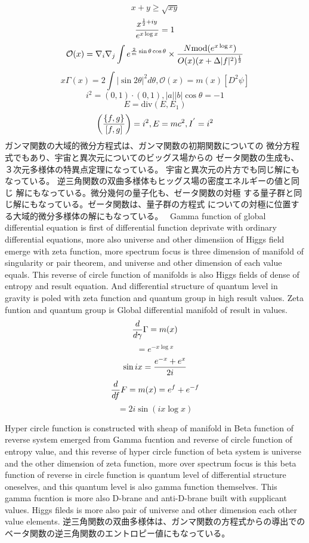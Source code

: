 \documentclass{jsarticle}
\begin{document}
{    $$ {x + y} \ge \sqrt{x y} $$
    $$ {x^{{1 \over 2} + iy} \over e^{x \log x}} = 1 $$
    $$ \mathcal{O}(x) = \nabla_i \nabla_j \int e^{{2 \over m}\sin \theta 
    \cos \theta } \times {{N \mathrm{mod}(e^{x \log x})} \over {O(x)(x +
    \Delta |f|^2)^{1 \over 2}}} $$
    $$ x \Gamma(x) = 2 \int|\sin 2 \theta|^2 d \theta, \mathcal{O}(x)
    = m(x)[D^2 \psi] $$
    $$ i^2 = (0,1) \cdot (0,1), |a||b|\cos \theta = - 1 $$
    $$ E = \mathrm{div}(E, E_1) $$
    $$ \left({\{f,g\}} \over [f,g] \right) = i^2, E = mc^2, I^{'} = i^2 $$
    ガンマ関数の大域的微分方程式は、ガンマ関数の初期関数についての
    微分方程式でもあり、宇宙と異次元についてのビッグス場からの
    ゼータ関数の生成も、３次元多様体の特異点定理になっている。
    宇宙と異次元の片方でも同じ解にもなっている。
    逆三角関数の双曲多様体もヒッグス場の密度エネルギーの値と同じ
    解にもなっている。微分幾何の量子化も、ゼータ関数の対極
    する量子群と同じ解にもなっている。ゼータ関数は、量子群の方程式
    についての対極に位置する大域的微分多様体の解にもなっている。　
    Gamma function of global differential equation is first of differential
    function deprivate with ordinary differential equations, more also
    universe and other dimensiion of Higgs field emerge with zeta function,
    more spectrum focus is three dimension of manifold of singularity or pair
    theorem, and universe and other dimension of each value equals.
    This reverse of circle function of manifolds is also Higgs fields of 
    dense of entropy and result equation. And differential structure of quantum
    level in gravity is poled with zeta function and quantum group in high 
    result values. Zeta funtion and quantum group is Global differential
    manifold of result in values.
    $$ {d \over d \gamma} \Gamma = m(x) $$
    $$ = e^{- x \log x} $$
    $$ \sin i x = {{e^{-x} + e^{x}} \over 2i} $$
    $$ {d \over df}F = m(x) = e^{f} + e^{-f} $$
    $$ = 2 i \sin (i {x \log x}) $$

    Hyper circle function is constructed with sheap of manifold in 
    Beta function of reverse system emerged from Gamma fucntion 
    and reverse of circle function of entropy value,
    and this reverse of hyper circle function of beta system
    is universe and the other dimension of zeta function,
    more over spectrum focus is this beta function of reverse in
    circle function is quantum level of differential structure oneselves,
    and this quantum level is also gamma function themselves.
    This gamma fucntion is more also D-brane and anti-D-brane built 
    with supplicant values. Higgs fileds is more also pair of universe and
    other dimension each other value elements. 
    逆三角関数の双曲多様体は、ガンマ関数の方程式からの導出での
    ベータ関数の逆三角関数のエントロピー値にもなっている。


}
\end{document}
